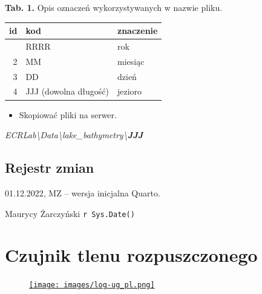 \documentclass[
  letterpaper,
  DIV=11,
  numbers=noendperiod]{scrreprt}
\providecommand{\tightlist}{%
  \setlength{\itemsep}{0pt}\setlength{\parskip}{0pt}}\usepackage{longtable,booktabs,array}
\begin{document}
\textbf{Tab. 1.} Opis oznaczeń wykorzystywanych w nazwie pliku.

\begin{longtable}[]{@{}rll@{}}
\toprule\noalign{}
id & kod & znaczenie \\
\midrule\noalign{}
\endhead
\bottomrule\noalign{}
\endlastfoot
1 & RRRR & rok \\
2 & MM & miesiąc \\
3 & DD & dzień \\
4 & JJJ (dowolna długość) & jezioro \\
\end{longtable}

\begin{itemize}
\tightlist
\item
  Skopiować pliki na serwer.
\end{itemize}

\begin{tcolorbox}[enhanced jigsaw, toptitle=1mm, bottomtitle=1mm, opacitybacktitle=0.6, colframe=quarto-callout-note-color-frame, bottomrule=.15mm, title=\textcolor{quarto-callout-note-color}{\faInfo}\hspace{0.5em}{Lokalizacja danych}, colbacktitle=quarto-callout-note-color!10!white, left=2mm, breakable, rightrule=.15mm, colback=white, opacityback=0, arc=.35mm, coltitle=black, leftrule=.75mm, toprule=.15mm, titlerule=0mm]

\emph{ECRLab\textbackslash Data\textbackslash lake\_bathymetry\textbackslash{}\textbf{JJJ}}

\end{tcolorbox}

\newpage{}

\hypertarget{rejestr-zmian}{%
\section{Rejestr zmian}\label{rejestr-zmian}}

01.12.2022, MZ -- wersja inicjalna Quarto.

Maurycy Żarczyński \texttt{r\ Sys.Date()}

\hypertarget{czujnik-tlenu-rozpuszczonego}{%
\chapter{Czujnik tlenu
rozpuszczonego}\label{czujnik-tlenu-rozpuszczonego}}

\begin{figure}

\href{https://geomorfologia.ug.edu.pl}{\texttt{[image: images/log-ug\_pl.png]}}

\end{figure}
\end{document}
